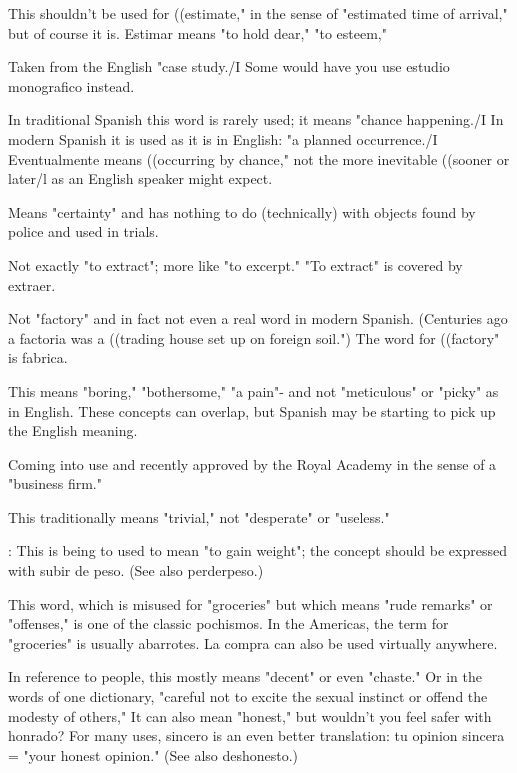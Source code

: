  This shouldn't be used for ((estimate," in the sense
of "estimated time of arrival," but of course it is. Estimar means "to
hold dear," "to esteem,"

 Taken from the English "case study./I
Some would have you use estudio monografico instead.

 In traditional Spanish this word is rarely used; it
means "chance happening./I In modern Spanish it is used as it is in
English: "a planned occurrence./I Eventualmente means ((occurring
by chance," not the more inevitable ((sooner or later/l as an English
speaker might expect.

 Means "certainty" and has nothing to do (technically) with objects found by police and used in trials.

 Not exactly "to extract"; more like "to excerpt."
"To extract" is covered by extraer.

 Not "factory" and in fact not even a real word in
modern Spanish. (Centuries ago a factoria was a ((trading house set up
on foreign soil.") The word for ((factory" is fabrica.

 This means "boring," "bothersome," "a pain"-
and not "meticulous" or "picky" as in English. These concepts can
overlap, but Spanish may be starting to pick up the English meaning.

 Coming into use and recently approved by the Royal
Academy in the sense of a "business firm."

 This traditionally means "trivial," not "desperate" or
"useless."

 : This is being to used to mean "to gain
weight"; the concept should be expressed with subir de peso. (See
also perderpeso.)

 This word, which is misused for "groceries" but
which means "rude remarks" or "offenses," is one of the classic pochismos. In the Americas, the term for "groceries" is usually abarrotes. La compra can also be used virtually anywhere.

 In reference to people, this mostly means "decent"
or even "chaste." Or in the words of one dictionary, "careful not to excite the sexual instinct or offend the modesty of others," It can also
mean "honest," but wouldn't you feel safer with honrado? For many
uses, sincero is an even better translation: tu opinion sincera = "your
honest opinion." (See also deshonesto.)

